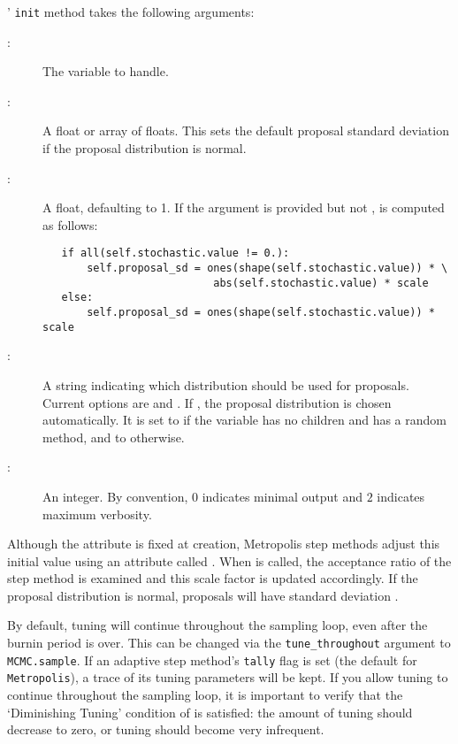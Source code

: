 ' \texttt{init} method takes the following arguments:
\begin{description}
   \item[:] The variable to handle.
   \item[:] A float or array of floats. This sets the
    default proposal standard deviation if the proposal distribution is normal.
   \item[:] A float, defaulting to 1. If the  argument is provided but not ,  is computed as follows:
   \begin{verbatim}
   if all(self.stochastic.value != 0.):
       self.proposal_sd = ones(shape(self.stochastic.value)) * \
                           abs(self.stochastic.value) * scale
   else:
       self.proposal_sd = ones(shape(self.stochastic.value)) * scale
   \end{verbatim}
   \item[:] A string indicating which distribution should be used for proposals. Current options are  and . If , the proposal distribution is chosen automatically. It is set to  if the variable has no children and has a random method, and to  otherwise.
   \item[\code{verbose}:] An integer. By convention, $0$ indicates minimal output and $2$ indicates maximum verbosity.
\end{description}

Although the  attribute is fixed at creation, Metropolis step methods adjust this initial value using an attribute called . When  is called, the acceptance ratio of the step method is examined and this scale factor is updated accordingly. If the proposal distribution is normal, proposals will have standard deviation .

By default, tuning will continue throughout the sampling loop, even after the burnin period is over. This can be changed via the \texttt{tune\_throughout} argument to \texttt{MCMC.sample}. If an adaptive step method's \texttt{tally} flag is set (the default for \texttt{Metropolis}), a trace of its tuning parameters will be kept. If you allow tuning to continue throughout the sampling loop, it is important to verify that the `Diminishing Tuning' condition of \cite{tuning} is satisfied: the amount of tuning should decrease to zero, or tuning should become very infrequent.

